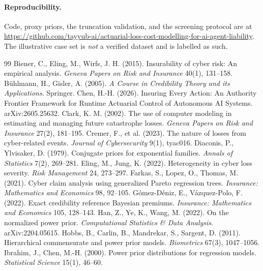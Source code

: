 \documentclass[11pt]{article}
\begin{document}
\paragraph{Reproducibility.} Code, proxy priors, the truncation validation, and the screening
protocol are at \url{https://github.com/tayyub-ai/actuarial-loss-cost-modelling-for-ai-agent-liability}.
The illustrative case set is \emph{not} a verified dataset and is labelled as such.


\begin{thebibliography}{99}
 Biener, C., Eling, M., Wirfs, J. H. (2015). Insurability of cyber risk: An empirical analysis. \emph{Geneva Papers on Risk and Insurance} 40(1), 131--158.
 B\"uhlmann, H., Gisler, A. (2005). \emph{A Course in Credibility Theory and its Applications}. Springer.
 Chen, H.-H. (2026). Insuring Every Action: An Authority Frontier Framework for Runtime Actuarial Control of Autonomous AI Systems. arXiv:2605.25632.
 Clark, K. M. (2002). The use of computer modeling in estimating and managing future catastrophe losses. \emph{Geneva Papers on Risk and Insurance} 27(2), 181--195.
 Cremer, F., et al. (2023). The nature of losses from cyber-related events. \emph{Journal of Cybersecurity} 9(1), tyac016.
 Diaconis, P., Ylvisaker, D. (1979). Conjugate priors for exponential families. \emph{Annals of Statistics} 7(2), 269--281.
 Eling, M., Jung, K. (2022). Heterogeneity in cyber loss severity. \emph{Risk Management} 24, 273--297.
 Farkas, S., Lopez, O., Thomas, M. (2021). Cyber claim analysis using generalized Pareto regression trees. \emph{Insurance: Mathematics and Economics} 98, 92--105.
 G\'omez-D\'eniz, E., V\'azquez-Polo, F. (2022). Exact credibility reference Bayesian premiums. \emph{Insurance: Mathematics and Economics} 105, 128--143.
 Han, Z., Ye, K., Wang, M. (2022). On the normalized power prior. \emph{Computational Statistics \& Data Analysis}. arXiv:2204.05615.
 Hobbs, B., Carlin, B., Mandrekar, S., Sargent, D. (2011). Hierarchical commensurate and power prior models. \emph{Biometrics} 67(3), 1047--1056.
 Ibrahim, J., Chen, M.-H. (2000). Power prior distributions for regression models. \emph{Statistical Science} 15(1), 46--60.

\end{thebibliography}
\end{document}
